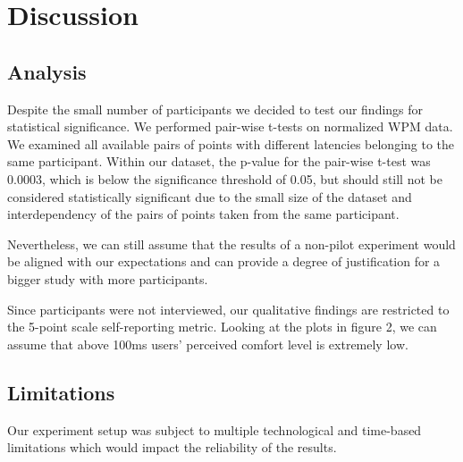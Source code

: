 \section{Discussion}

\subsection{Analysis}

Despite the small number of participants we decided to test our findings for statistical significance.
We performed pair-wise t-tests on normalized WPM data. We examined all available pairs of points with different latencies belonging to the same participant. Within our dataset, the p-value for the pair-wise t-test was 0.0003, which is below the significance threshold of 0.05, but should still not be considered statistically significant due to the small size of the dataset and interdependency of the pairs of points taken from the same participant.

Nevertheless, we can still assume that the results of a non-pilot experiment would be aligned with our expectations and can provide a degree of justification for a bigger study with more participants.

Since participants were not interviewed, our qualitative findings are restricted to the 5-point scale self-reporting metric. Looking at the plots in figure 2, we can assume that above 100ms users' perceived comfort level is extremely low.
\subsection{Limitations}

Our experiment setup was subject to multiple technological and time-based limitations which would impact the reliability of the results. 

